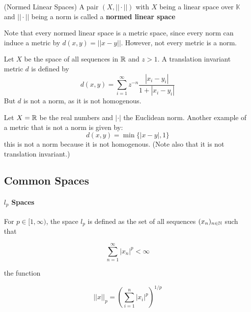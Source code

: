 \documentclass{article}
\begin{document}
\begin{defn}
(Normed Linear Spaces) A pair $(X, ||\cdot||)$ with $X$ being a linear space over $\mathbb{K}$ and 
                    $||\cdot||$ being a norm is called a \textbf{normed linear space}
\end{defn} 

Note that every normed linear space is a metric space, since every norm can induce a metric by $d(x,y)=||x-y||$. 
However, not every metric is a norm.  

\begin{eg}
    Let $X$ be the space of all sequences in $\mathbb{R}$ and $z>1$. A translation invariant metric $d$ is defined by  
    \begin{equation*}
        d(x,y) = \sum_{i=1}^{\infty} z^{-n} \dfrac{|x_i-y_i|}{1+|x_i-y_i|}
    \end{equation*}  
    But $d$ is not a norm, as it is not homogenous.
\end{eg}  

\begin{eg}
    Let $X=\mathbb{R}$ be the real numbers and $|\cdot|$ the Euclidean norm. Another example of a metric that is not a norm 
    is given by:
    \begin{equation*}
        d(x,y) = \min \{|x-y|, 1\}
    \end{equation*}  
    this is not a norm because it is not homogenous. (Note also that it is not translation invariant.)
\end{eg}  

\subsection{Common Spaces}  

\paragraph*{$l_p$ Spaces}    
For $p \in [1,\infty)$, the space $l_p$ is defined as the set of all sequences $(x_n)_{n\in \mathbb{N}}$ such that  

\begin{equation*}
    \sum_{n=1}^{\infty} |x_n|^p < \infty
\end{equation*}

the function  

\begin{equation*}
    ||x||_p = \left(\sum_{i=1}^n |x_i|^p\right)^{1/p}
\end{equation*}  
\end{document}
